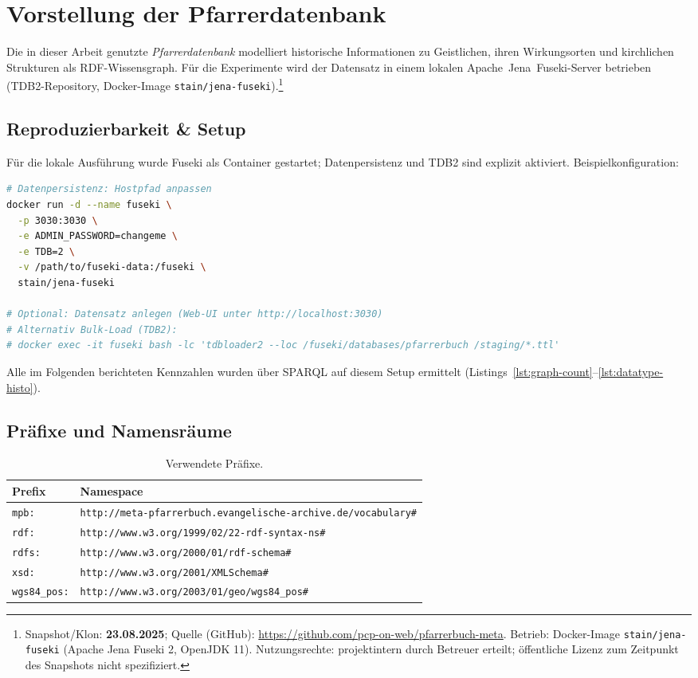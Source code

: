 \section{Vorstellung der Pfarrerdatenbank}
\label{sec:Pfarrerdatenbank}

Die in dieser Arbeit genutzte \emph{Pfarrerdatenbank} modelliert historische Informationen zu Geistlichen, ihren Wirkungsorten und kirchlichen Strukturen als RDF-Wissensgraph. Für die Experimente wird der Datensatz in einem lokalen Apache~Jena~Fuseki-Server betrieben (TDB2-Repository, Docker-Image \texttt{stain/jena-fuseki}).\footnote{%
Snapshot/Klon: \textbf{23.08.2025}; Quelle (GitHub): \url{https://github.com/pcp-on-web/pfarrerbuch-meta}.
Betrieb: Docker-Image \texttt{stain/jena-fuseki} (Apache Jena Fuseki 2, OpenJDK 11). Nutzungsrechte: projektintern durch Betreuer erteilt; öffentliche Lizenz zum Zeitpunkt des Snapshots nicht spezifiziert.}

\subsection*{Reproduzierbarkeit \& Setup}
Für die lokale Ausführung wurde Fuseki als Container gestartet; Datenpersistenz und TDB2 sind explizit aktiviert. Beispielkonfiguration:
\begin{lstlisting}[language=bash,caption={Start von Fuseki (Docker) mit TDB2 und persistenter Datenablage.},label={lst:fuseki-docker}]
# Datenpersistenz: Hostpfad anpassen
docker run -d --name fuseki \
  -p 3030:3030 \
  -e ADMIN_PASSWORD=changeme \
  -e TDB=2 \
  -v /path/to/fuseki-data:/fuseki \
  stain/jena-fuseki

# Optional: Datensatz anlegen (Web-UI unter http://localhost:3030)
# Alternativ Bulk-Load (TDB2):
# docker exec -it fuseki bash -lc 'tdbloader2 --loc /fuseki/databases/pfarrerbuch /staging/*.ttl'
\end{lstlisting}
Alle im Folgenden berichteten Kennzahlen wurden über SPARQL auf diesem Setup ermittelt (Listings~\ref{lst:graph-count}–\ref{lst:datatype-histo}).

\subsection*{Präfixe und Namensräume}
\begin{table}[h]
\centering
\begin{tabular}{ll}
\textbf{Prefix} & \textbf{Namespace} \\
\hline
\texttt{mpb:} & \texttt{http://meta-pfarrerbuch.evangelische-archive.de/vocabulary\#} \\
\texttt{rdf:} & \texttt{http://www.w3.org/1999/02/22-rdf-syntax-ns\#} \\
\texttt{rdfs:} & \texttt{http://www.w3.org/2000/01/rdf-schema\#} \\
\texttt{xsd:} & \texttt{http://www.w3.org/2001/XMLSchema\#} \\
\texttt{wgs84\_pos:} & \texttt{http://www.w3.org/2003/01/geo/wgs84\_pos\#}
\end{tabular}
\caption{Verwendete Präfixe.}
\label{tab:pfarrerbuch-prefixes}
\end{table}

